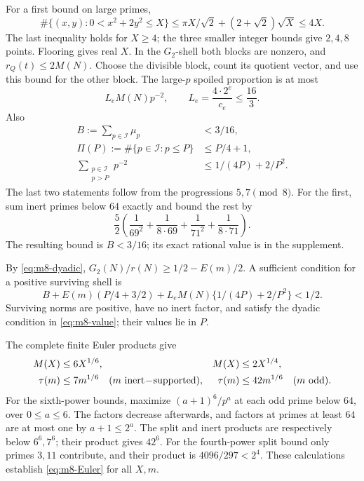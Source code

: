 For a first bound on large primes,
\[
  \#\{(x,y):0<x^2+2y^2\le X\}
       \le\pi X/\sqrt2+(2+\sqrt2)\sqrt X\le4X .
\]
The last inequality holds for \(X\ge4\); the three smaller
integer bounds give \(2,4,8\) points. Flooring gives real \(X\).
In the \(G_2\)-shell both blocks are nonzero, and
\(r_Q(t)\le2M(N)\). Choose the divisible block, count its
quotient vector, and use this bound for the other block.
The large-\(p\) spoiled proportion is at most
\begin{equation}
                    L_eM(N)p^{-2},\qquad
               L_e=\frac{4\cdot2^e}{c_e}\le\frac{16}{3}.       \label{eq:m8-coarsetail}
\end{equation}
Also
\begin{equation}
\begin{aligned}
 B:=\sum_{p\in\mathcal I}\mu_p&<3/16,\\
 \Pi(P):=\#\{p\in\mathcal I:p\le P\}&\le P/4+1,\\
 \sum_{\substack{p\in\mathcal I\\p>P}}p^{-2}
                    &\le1/(4P)+2/P^2.                       \end{aligned}\label{eq:m8-progression}
\end{equation}
The last two statements follow from the progressions \(5,7\pmod8\).
For the first, sum inert primes below \(64\) exactly and bound
the rest by
\[
 \frac52\left(\frac1{69^2}+\frac1{8\cdot69}
                  +\frac1{71^2}+\frac1{8\cdot71}\right).
\]
The resulting bound is
\(B<3/16\); its exact rational value is in the supplement.

By \eqref{eq:m8-dyadic}, \(G_2(N)/r(N)\ge1/2-E(m)/2\).
A sufficient condition for a positive surviving shell is
\begin{equation}
 B+E(m)(P/4+3/2)
      +L_eM(N)\{1/(4P)+2/P^2\}<1/2.                          \label{eq:m8-coarse}
\end{equation}
Surviving norms are positive, have no inert factor, and satisfy
the dyadic condition in \eqref{eq:m8-value}; their values lie in \(P\).

The complete finite Euler products give
\begin{equation}
\begin{aligned}
 M(X)&\le6X^{1/6},& M(X)&\le2X^{1/4},\\
 \tau(m)&\le7m^{1/6}\quad(m\ {\rm inert\!-\!supported}),&
 \tau(m)&\le42m^{1/6}\quad(m\ {\rm odd}).                       \end{aligned}\label{eq:m8-Euler}
\end{equation}
For the sixth-power bounds, maximize
\((a+1)^6/p^a\) at each odd prime below \(64\), over \(0\le a\le6\).
The factors decrease afterwards, and factors at primes at least
\(64\) are at most one by \(a+1\le2^a\).
The split and inert products are respectively below \(6^6,7^6\);
their product gives \(42^6\).
For the fourth-power split bound only primes \(3,11\) contribute,
and their product is \(4096/297<2^4\).
These calculations establish \eqref{eq:m8-Euler} for all \(X,m\).

